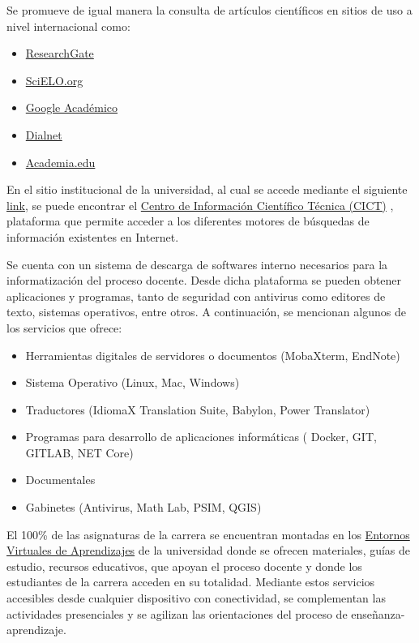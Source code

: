 Se promueve de igual manera la consulta de artículos científicos en sitios de uso a nivel internacional como:

\begin{itemize}
	\item \href{https://www.researchgate.net}{ResearchGate}
	\item \href{https://www.scielo.org/es}{SciELO.org}
	\item \href{https://scholar.google.com/}{Google Académico}
	\item \href{https://dialnet.unirioja.es}{Dialnet}
	\item \href{https://www.academia.edu}{Academia.edu}
\end{itemize}

En el sitio institucional de la universidad, al cual se accede mediante el siguiente \href{https://www.umcc.cu/}{link}, se puede encontrar el \href{http://cict.umcc.cu/}{Centro de Información Científico Técnica (CICT)} , plataforma que permite acceder a los diferentes motores de búsquedas de información existentes en Internet.

Se cuenta con un sistema de descarga de softwares interno necesarios para la informatización del proceso docente. Desde dicha plataforma se pueden obtener aplicaciones y programas, tanto de seguridad con antivirus como editores de texto, sistemas operativos, entre otros. A continuación, se mencionan algunos de los servicios que ofrece:

\begin{itemize}
	\item Herramientas digitales de servidores o documentos (MobaXterm, EndNote)
	\item Sistema Operativo (Linux, Mac, Windows)
	\item Traductores (IdiomaX Translation Suite, Babylon, Power Translator)
	\item Programas para desarrollo de aplicaciones informáticas ( Docker, GIT, GITLAB, NET Core)
	\item Documentales
	\item Gabinetes (Antivirus, Math Lab, PSIM, QGIS) 
\end{itemize}

El 100\% de las asignaturas de la carrera se encuentran montadas en los \href{https://eva.umcc.cu/}{Entornos Virtuales de Aprendizajes} de la universidad donde se ofrecen materiales, guías de estudio, recursos educativos, que apoyan el proceso docente y donde los estudiantes de la carrera acceden en su totalidad. Mediante estos servicios accesibles desde cualquier dispositivo con conectividad, se complementan las actividades presenciales y se agilizan las orientaciones del proceso de enseñanza-aprendizaje.
